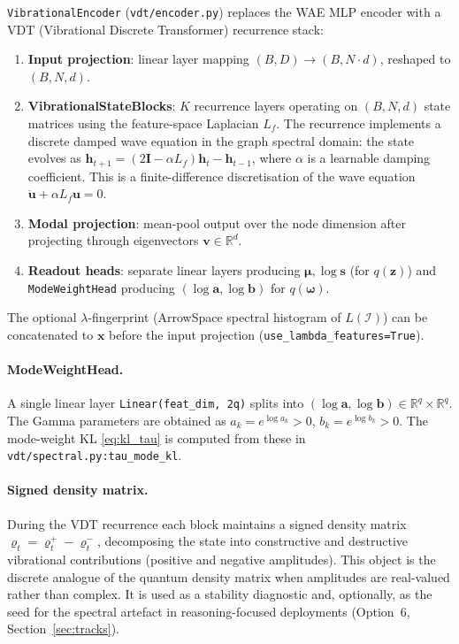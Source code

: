 \documentclass[11pt,a4paper]{article}
\newcommand{\R}{\mathbb{R}}
\newcommand{\I}{\mathcal{I}}
\newcommand{\bz}{\bm{z}}
\newcommand{\bmu}{\bm{\mu}}
\newcommand{\bomega}{\bm{\omega}}
\newcommand{\bx}{\bm{x}}
\begin{document}
\texttt{VibrationalEncoder} (\texttt{vdt/encoder.py}) replaces the WAE MLP
encoder with a VDT (Vibrational Discrete Transformer) recurrence stack:
\begin{enumerate}
  \item \textbf{Input projection}: linear layer mapping $(B,D)\to(B,N{\cdot}d)$,
        reshaped to $(B,N,d)$.
  \item \textbf{VibrationalStateBlocks}: $K$ recurrence layers operating on
        $(B,N,d)$ state matrices using the feature-space Laplacian $L_f$.  The
        recurrence implements a discrete damped wave equation in the graph
        spectral domain: the state evolves as
        $\mathbf{h}_{t+1} = (2\bm{I} - \alpha L_f)\mathbf{h}_t - \mathbf{h}_{t-1}$,
        where $\alpha$ is a learnable damping coefficient.  This is a
        finite-difference discretisation of the wave equation
        $\ddot{\mathbf{u}} + \alpha L_f\mathbf{u} = 0$.
  \item \textbf{Modal projection}: mean-pool output over the node dimension
        after projecting through eigenvectors $\bm{v}\in\R^d$.
  \item \textbf{Readout heads}: separate linear layers producing
        $\bmu,\log\bm{s}$ (for $q(\bz)$) and \texttt{ModeWeightHead}
        producing $(\log\bm{a},\log\bm{b})$ for $q(\bomega)$.
\end{enumerate}
The optional $\lambda$-fingerprint (ArrowSpace spectral histogram of $L(\I)$)
can be concatenated to $\bx$ before the input projection
(\texttt{use\_lambda\_features=True}).

\paragraph{ModeWeightHead.}
A single linear layer \texttt{Linear(feat\_dim, 2q)} splits into
$(\log\bm{a}, \log\bm{b})\in\R^q\times\R^q$.  The Gamma parameters are
obtained as $a_k = e^{\log a_k}>0$, $b_k = e^{\log b_k}>0$.
The mode-weight KL \eqref{eq:kl_tau} is computed from these in
\texttt{vdt/spectral.py:tau\_mode\_kl}.

\paragraph{Signed density matrix.}
During the VDT recurrence each block maintains a signed density matrix
$\varrho_t = \varrho_t^+ - \varrho_t^-$, decomposing the state into
constructive and destructive vibrational contributions (positive and negative
amplitudes).  This object is the discrete analogue of the quantum density
matrix when amplitudes are real-valued rather than complex.  It is used as a
stability diagnostic and, optionally, as the seed for the spectral artefact in
reasoning-focused deployments (Option~6, Section~\ref{sec:tracks}).
\end{document}
